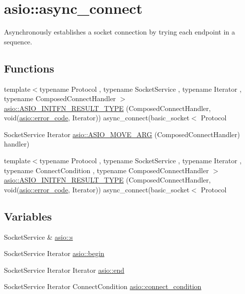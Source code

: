 \hypertarget{group__async__connect}{}\section{asio\+:\+:async\+\_\+connect}
\label{group__async__connect}


Asynchronously establishes a socket connection by trying each endpoint in a sequence.  


\subsection*{Functions}
\begin{DoxyCompactItemize}
\item 
{\footnotesize template$<$typename Protocol , typename Socket\+Service , typename Iterator , typename Composed\+Connect\+Handler $>$ }\\\hyperlink{group__async__connect_ga7b8de8138419acd99224c0a7071a99a0}{asio\+::\+A\+S\+I\+O\+\_\+\+I\+N\+I\+T\+F\+N\+\_\+\+R\+E\+S\+U\+L\+T\+\_\+\+T\+Y\+P\+E} (Composed\+Connect\+Handler, void(\hyperlink{classasio_1_1error__code}{asio\+::error\+\_\+code}, Iterator)) async\+\_\+connect(basic\+\_\+socket$<$ Protocol
\item 
Socket\+Service Iterator \hyperlink{group__async__connect_ga62bf3d82e9459cfd1fc6f51024aceb25}{asio\+::\+A\+S\+I\+O\+\_\+\+M\+O\+V\+E\+\_\+\+A\+R\+G} (Composed\+Connect\+Handler) handler)
\item 
{\footnotesize template$<$typename Protocol , typename Socket\+Service , typename Iterator , typename Connect\+Condition , typename Composed\+Connect\+Handler $>$ }\\\hyperlink{group__async__connect_ga97861978f077050db440c518ba215350}{asio\+::\+A\+S\+I\+O\+\_\+\+I\+N\+I\+T\+F\+N\+\_\+\+R\+E\+S\+U\+L\+T\+\_\+\+T\+Y\+P\+E} (Composed\+Connect\+Handler, void(\hyperlink{classasio_1_1error__code}{asio\+::error\+\_\+code}, Iterator)) async\+\_\+connect(basic\+\_\+socket$<$ Protocol
\end{DoxyCompactItemize}
\subsection*{Variables}
\begin{DoxyCompactItemize}
\item 
Socket\+Service \& \hyperlink{group__async__connect_ga31ab74b9ea6c77932dddd016cfc7920a}{asio\+::s}
\item 
Socket\+Service Iterator \hyperlink{group__async__connect_ga7055bca9225050c030c19c7dc926fa53}{asio\+::begin}
\item 
Socket\+Service Iterator Iterator \hyperlink{group__async__connect_gadb6ad0193229ae84828688e812cd325c}{asio\+::end}
\item 
Socket\+Service Iterator Connect\+Condition \hyperlink{group__async__connect_ga47e3dda205dfba3553f4c7e005897687}{asio\+::connect\+\_\+condition}
\end{DoxyCompactItemize}



